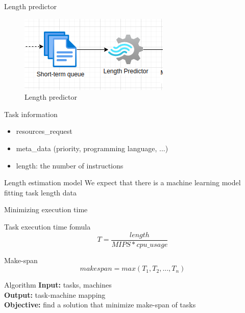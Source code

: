 \documentclass[10pt,xcolor={dvipsnames}, aspectratio=169]{beamer}
\begin{document}
\begin{frame}
{Length predictor}
	\begin{figure}
		\centering
		\includegraphics[scale=0.5]{images/length_predictor.png}
		\caption{Length predictor}
	\end{figure}
	\begin{block}
	{Task information}
		\begin{itemize}
			\item resources\_request
			\item meta\_data (priority, programming language, ...)
			\item length: the number of instructions 
		\end{itemize}
	\end{block}
	
	\begin{block}
	{Length estimation model}
	We expect that there is a machine learning model fitting task length data
	\end{block}
\end{frame}

\begin{frame}
{Minimizing execution time} 

	\begin{block}
	{Task execution time fomula}
		\begin{equation*}
			T = \frac{length}{MIPS * cpu\_usage}
		\end{equation*}
	\end{block}
	\begin{block}
	{Make-span}
		\begin{equation*}
			makespan = max(T_{1}, T_{2}, ..., T_{n})
		\end{equation*}
	\end{block}
	\begin{block}
	{Algorithm}
	\textbf{Input: }tasks, machines \\
	\textbf{Output: } task-machine mapping \\
	\textbf{Objective: } find a solution that minimize make-span of tasks
	\end{block}
\end{frame}
\end{document}
